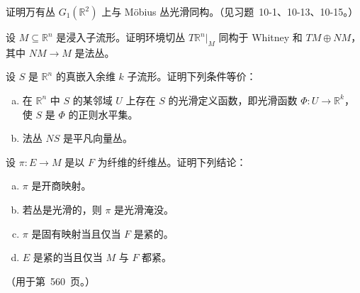 \documentclass[../../main.tex]{subfiles}
\begin{document}
\begin{exercise}\label{exercise:ch10-16}
证明万有丛 $G_1(\mathbb{R}^2)$ 上与 Möbius 丛光滑同构。（见习题~10-1、10-13、10-15。）
\end{exercise}

\begin{exercise}\label{exercise:ch10-17}
设 $M\subseteq\mathbb{R}^n$ 是浸入子流形。证明环境切丛 $T\mathbb{R}^n|_M$ 同构于 Whitney 和 $TM\oplus NM$，其中 $NM\to M$ 是法丛。
\end{exercise}

\begin{exercise}\label{exercise:ch10-18}
设 $S$ 是 $\mathbb{R}^n$ 的真嵌入余维 $k$ 子流形。证明下列条件等价：
\begin{enumerate}[(a)]
\item 在 $\mathbb{R}^n$ 中 $S$ 的某邻域 $U$ 上存在 $S$ 的光滑定义函数，即光滑函数 $\Phi\colon U\to\mathbb{R}^k$，使 $S$ 是 $\Phi$ 的正则水平集。
\item 法丛 $NS$ 是平凡向量丛。
\end{enumerate}
\end{exercise}

\begin{exercise}\label{exercise:ch10-19}
设 $\pi\colon E\to M$ 是以 $F$ 为纤维的纤维丛。证明下列结论：
\begin{enumerate}[(a)]
\item $\pi$ 是开商映射。
\item 若丛是光滑的，则 $\pi$ 是光滑淹没。
\item $\pi$ 是固有映射当且仅当 $F$ 是紧的。
\item $E$ 是紧的当且仅当 $M$ 与 $F$ 都紧。
\end{enumerate}
（用于第~560~页。）
\end{exercise}
\end{document}
